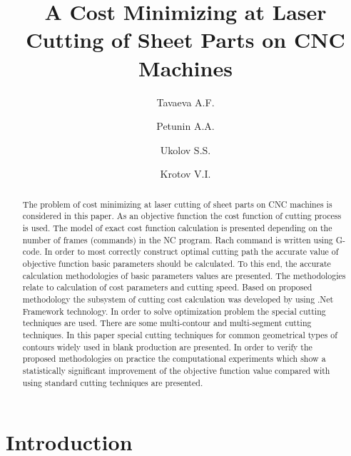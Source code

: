 \documentclass[runningheads]{llncs}
\begin{document}
\title{A Cost Minimizing at Laser Cutting of Sheet Parts on CNC Machines}

\author{
  Tavaeva A.F. 
  \and
  Petunin A.A. 
  \and
  Ukolov S.S. 
  \and Krotov V.I. 
}

\maketitle              %

\begin{abstract}
The problem of cost minimizing at laser cutting of sheet parts on CNC machines is considered
in this paper.
As an objective function the cost function of cutting process is used.
The model of exact cost function calculation is presented
depending on the number of frames (commands) in the NC program.
Rach command is written using G-code.
In order to most correctly construct optimal cutting path
the accurate value of objective function basic parameters should be calculated.
To this end,
the accurate calculation methodologies of basic parameters values are presented.
The methodologies relate to calculation of cost parameters and cutting speed.
Based on proposed methodology the subsystem of cutting cost calculation was developed by
using .Net Framework technology.
In order to solve optimization problem
the special cutting techniques are used.
There are some multi-contour and multi-segment cutting techniques.
In this paper special cutting techniques
for common geometrical types of contours
widely used in blank production are presented.
In order to verify the proposed methodologies on practice
the computational experiments which show
a statistically significant improvement of the objective function value
compared with using standard cutting techniques are presented.

\end{abstract}

\section{Introduction}
\end{document}

